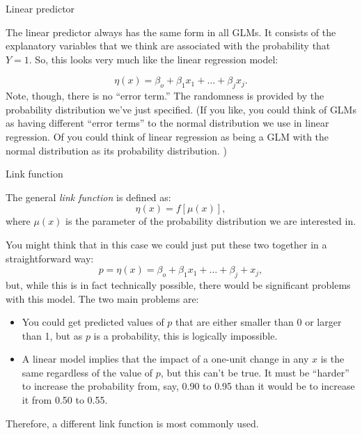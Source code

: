 \documentclass[10pt,ignorenonframetext,]{beamer}
\providecommand{\tightlist}{%
\setlength{\itemsep}{0pt}\setlength{\parskip}{0pt}}
\begin{document}
\begin{frame}{Linear predictor}

The linear predictor always has the same form in all GLMs. It consists
of the explanatory variables that we think are associated with the
probability that \(Y = 1.\) So, this looks very much like the linear
regression model:

\[
\eta(x) = \beta_o + \beta_1 x_1 + \dots + \beta_j x_j.
\] Note, though, there is no ``error term.'' The randomness is provided
by the probability distribution we've just specified. (If you like, you
could think of GLMs as having different ``error terms'' to the normal
distribution we use in linear regression. Of you could think of linear
regression as being a GLM with the normal distribution as its
probability distribution. )

\end{frame}

\begin{frame}{Link function}

The general \emph{link function} is defined as: \[
\eta(x) = f[\mu(x)],
\] where \(\mu(x)\) is the parameter of the probability distribution we
are interested in.

You might think that in this case we could just put these two together
in a straightforward way: \[
p = \eta(x) = \beta_o + \beta_1 x_1 + \dots + \beta_j + x_j,
\] but, while this is in fact technically possible, there would be
significant problems with this model. The two main problems are:

\begin{itemize}
\tightlist
\item
  You could get predicted values of \(p\) that are either smaller than 0
  or larger than 1, but as \(p\) is a probability, this is logically
  impossible.
\item
  A linear model implies that the impact of a one-unit change in any
  \(x\) is the same regardless of the value of \(p\), but this can't be
  true. It must be ``harder'' to increase the probability from, say,
  0.90 to 0.95 than it would be to increase it from 0.50 to 0.55.
\end{itemize}

Therefore, a different link function is most commonly used.

\end{frame}
\end{document}
